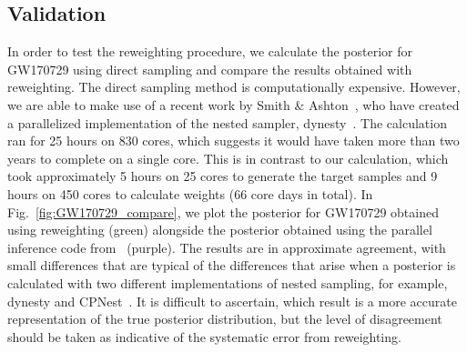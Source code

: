\documentclass[prd,superscriptaddress,twocolumn,nopreprintnumbers,floatfix,longbibliography]{revtex4}
\begin{document}



\begin{appendix}

\section{Validation}\label{validation}
In order to test the reweighting procedure, we calculate the posterior for GW170729 using direct sampling and compare the results obtained with reweighting.
The direct sampling method is computationally expensive.
However, we are able to make use of a recent work by Smith \& Ashton~\cite{SmithAshton}, who have created a parallelized implementation of the nested sampler, {\sc dynesty}~\cite{dynesty}.
The calculation ran for 25 hours on 830 cores, which suggests it would have taken more than two years to complete on a single core.
This is in contrast to our calculation, which took approximately 5 hours on 25 cores to generate the target samples and 9 hours on 450 cores to calculate weights (66 core days in total).
In Fig.~\ref{fig:GW170729_compare}, we plot the posterior for GW170729 obtained using reweighting (green) alongside the posterior obtained using the parallel inference code from~\cite{smith} (purple).
The results are in approximate agreement, with small differences that are typical of the differences that arise when a posterior is calculated with two different implementations of nested sampling, for example, {\sc dynesty} and {\sc CPNest}~\cite{cpnest}.
It is difficult to ascertain, which result is a more accurate representation of the true posterior distribution, but the level of disagreement should be taken as indicative of the  systematic error from reweighting.


\end{appendix}
\end{document}
